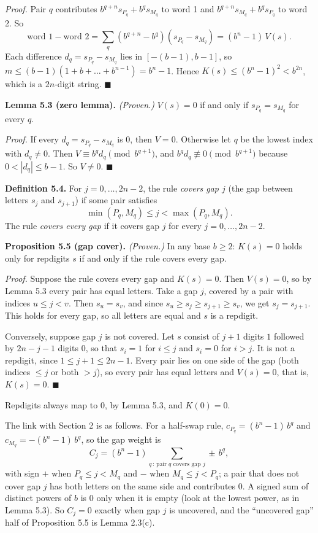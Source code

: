 \documentclass[11pt,letterpaper]{article}
\theoremstyle{paperstyle}
\theoremstyle{paperstyledef}
\theoremstyle{paperstylerem}
\begin{document}
\emph{Proof.} Pair \(q\) contributes \(b^{q+n} s_{P_q} + b^q s_{M_q}\) to word 1 and \(b^{q+n} s_{M_q} + b^q s_{P_q}\) to word 2. So \[\text{word 1} - \text{word 2} = \sum_q (b^{q+n} - b^q)(s_{P_q} - s_{M_q}) = (b^n - 1)\,V(s).\] Each difference \(d_q = s_{P_q} - s_{M_q}\) lies in \([-(b-1), b-1]\), so \(m \le (b-1)(1 + b + \dots + b^{n-1}) = b^n - 1\). Hence \(K(s) \le (b^n-1)^2 < b^{2n}\), which is a \(2n\)-digit string. \(\blacksquare\)

\textbf{Lemma 5.3 (zero lemma).} \emph{(Proven.)} \(V(s) = 0\) if and only if \(s_{P_q} = s_{M_q}\) for every \(q\).

\emph{Proof.} If every \(d_q = s_{P_q} - s_{M_q}\) is \(0\), then \(V = 0\). Otherwise let \(q\) be the lowest index with \(d_q \ne 0\). Then \(V \equiv b^q d_q \pmod{b^{q+1}}\), and \(b^q d_q \not\equiv 0 \pmod{b^{q+1}}\) because \(0 < |d_q| \le b-1\). So \(V \ne 0\). \(\blacksquare\)

\textbf{Definition 5.4.} For \(j = 0, \dots, 2n-2\), the rule \emph{covers gap \(j\)} (the gap between letters \(s_j\) and \(s_{j+1}\)) if some pair satisfies \[\min(P_q, M_q) \le j < \max(P_q, M_q).\] The rule \emph{covers every gap} if it covers gap \(j\) for every \(j = 0, \dots, 2n-2\).

\textbf{Proposition 5.5 (gap cover).} \emph{(Proven.)} In any base \(b \ge 2\): \(K(s) = 0\) holds only for repdigits \(s\) if and only if the rule covers every gap.

\emph{Proof.} Suppose the rule covers every gap and \(K(s) = 0\). Then \(V(s) = 0\), so by Lemma 5.3 every pair has equal letters. Take a gap \(j\), covered by a pair with indices \(u \le j < v\). Then \(s_u = s_v\), and since \(s_u \ge s_j \ge s_{j+1} \ge s_v\), we get \(s_j = s_{j+1}\). This holds for every gap, so all letters are equal and \(s\) is a repdigit.

Conversely, suppose gap \(j\) is not covered. Let \(s\) consist of \(j+1\) digits \(1\) followed by \(2n-j-1\) digits \(0\), so that \(s_i = 1\) for \(i \le j\) and \(s_i = 0\) for \(i > j\). It is not a repdigit, since \(1 \le j+1 \le 2n-1\). Every pair lies on one side of the gap (both indices \(\le j\) or both \(> j\)), so every pair has equal letters and \(V(s) = 0\), that is, \(K(s) = 0\). \(\blacksquare\)

Repdigits always map to \(0\), by Lemma 5.3, and \(K(0) = 0\).

The link with Section 2 is as follows. For a half-swap rule, \(c_{P_q} = (b^n - 1)\, b^q\) and \(c_{M_q} = -(b^n - 1)\, b^q\), so the gap weight is \[C_j = (b^n - 1) \sum_{q \,:\, \text{pair } q \text{ covers gap } j} \pm\, b^q,\] with sign \(+\) when \(P_q \le j < M_q\) and \(-\) when \(M_q \le j < P_q\); a pair that does not cover gap \(j\) has both letters on the same side and contributes \(0\). A signed sum of distinct powers of \(b\) is \(0\) only when it is empty (look at the lowest power, as in Lemma 5.3). So \(C_j = 0\) exactly when gap \(j\) is uncovered, and the ``uncovered gap'' half of Proposition 5.5 is Lemma 2.3(c).
\end{document}
